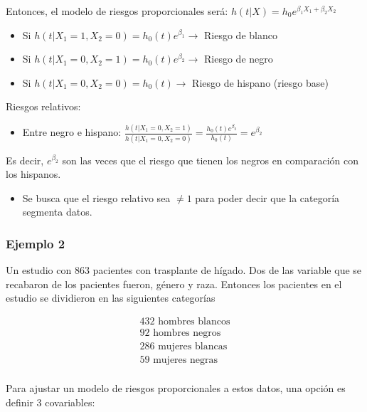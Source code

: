 \documentclass[
  a4paper,
  oneside,
  openany]{book}
\providecommand{\tightlist}{%
  \setlength{\itemsep}{0pt}\setlength{\parskip}{0pt}}
\begin{document}
Entonces, el modelo de riesgos proporcionales será: \(h(t|X) = h_0e^{\beta_1X_1+\beta_2X_2}\)

\begin{itemize}
\tightlist
\item
  Si \(h(t|X_1=1, X_2 = 0) = h_0(t)e^{\beta_1}\longrightarrow\) Riesgo de blanco
\item
  Si \(h(t|X_1=0, X_2 = 1) = h_0(t)e^{\beta_2}\longrightarrow\) Riesgo de negro
\item
  Si \(h(t|X_1=0, X_2 = 0) = h_0(t)\longrightarrow\) Riesgo de hispano (riesgo base)
\end{itemize}

Riesgos relativos:

\begin{itemize}
\tightlist
\item
  Entre negro e hispano: \(\frac{h(t|X_1 = 0, X_2 = 1)}{h(t|X_1 = 0, X_2 = 0)} = \frac{h_0(t)e^{\beta_2}}{h_{0}(t)}=e^{\beta_2}\)
\end{itemize}

Es decir, \(e^{\beta_2}\) son las veces que el riesgo que tienen los negros en comparación con los hispanos.

\begin{itemize}
\tightlist
\item
  Se busca que el riesgo relativo sea \(\neq1\) para poder decir que la categoría segmenta datos.
\end{itemize}

\hypertarget{ejemplo-2-2}{%
\subsubsection*{Ejemplo 2}\label{ejemplo-2-2}}


Un estudio con 863 pacientes con trasplante de hígado. Dos de las variable que se recabaron de los pacientes fueron, género y raza. Entonces los pacientes en el estudio se dividieron en las siguientes categorías

\[
\begin{array}{ll}
432 \mbox{ hombres blancos}\\
92 \mbox{ hombres negros}\\
286 \mbox{ mujeres blancas}\\
59 \mbox{ mujeres negras}\\
\end{array}
\]

Para ajustar un modelo de riesgos proporcionales a estos datos, una opción es definir 3 covariables:
\end{document}
